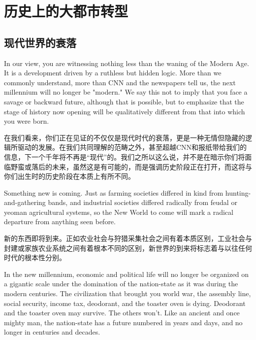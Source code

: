 \chapter[历史上的大都市转型]{历史上的大都市转型}

\section{现代世界的衰落}

\begin{Parallel}{97mm}{45mm}
  \ParallelLText
  {In our view, you are witnessing nothing less than the waning of the Modern Age. It is a development driven by a ruthless but hidden logic. More than we commonly understand, more than CNN and the newspapers tell us, the next millennium will no longer be "modern." We say this not to imply that you face a savage or backward future, although that is possible, but to emphasize that the stage of history now opening will be qualitatively different from that into which you were born.}
  
  \ParallelRText
  {在我们看来，你们正在见证的不仅仅是现代时代的衰落，更是一种无情但隐藏的逻辑所驱动的发展。在我们共同理解的范畴之外，甚至超越CNN和报纸带给我们的信息，下一个千年将不再是“现代”的。我们之所以这么说，并不是在暗示你们将面临野蛮或落后的未来，虽然这是有可能的，而是强调历史阶段正在打开，而这将与你们出生时的历史阶段在本质上有所不同。}
  
  \ParallelPar
  
  \ParallelLText
  {Something new is coming. Just as farming societies differed in kind from hunting-and-gathering bands, and industrial societies differed radically from feudal or yeoman agricultural systems, so the New World to come will mark a radical departure from anything seen before.}
  
  \ParallelRText
  {新的东西即将到来。正如农业社会与狩猎采集社会之间有着本质区别，工业社会与封建或家族农业系统之间有着根本不同的区别，新世界的到来将标志着与以往任何时代的根本性分别。}

  \ParallelPar


  \ParallelLText
  {In the new millennium, economic and political life will no longer be organized on a gigantic scale under the domination of the nation-state as it was during the modern centuries. The civilization that brought you world war, the assembly line, social security, income tax, deodorant, and the toaster oven is dying. Deodorant and the toaster oven may survive. The others won't. Like an ancient and once mighty man, the nation-state has a future numbered in years and days, and no longer in centuries and decades.}
  

\end{Parallel}

